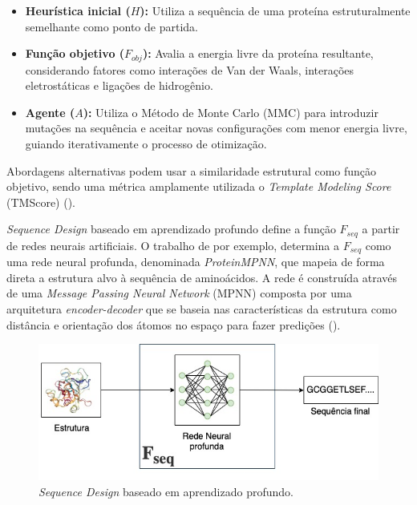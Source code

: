 \begin{itemize}
    \item \textbf{Heurística inicial ($H$):}  
    Utiliza a sequência de uma proteína estruturalmente semelhante como ponto de partida.

    \item \textbf{Função objetivo ($F_{obj}$):}  
    Avalia a energia livre da proteína resultante, considerando fatores como interações de Van der Waals,
    interações eletrostáticas e ligações de hidrogênio.

    \item \textbf{Agente ($A$):}  
    Utiliza o Método de Monte Carlo (MMC) para introduzir mutações na sequência e aceitar novas configurações com menor energia livre,
    guiando iterativamente o processo de otimização.
\end{itemize}

Abordagens alternativas podem usar a similaridade estrutural como função objetivo,
sendo uma métrica amplamente utilizada o \textit{Template Modeling Score} (TMScore) (\cite{tmscore}).

\textit{Sequence Design} baseado em aprendizado profundo define a função $F_{seq}$ 
a partir de redes neurais artificiais. 
O trabalho de \cite{ProteinMPNN} por exemplo, 
determina a $F_{seq}$ como uma rede neural profunda, denominada \textit{ProteinMPNN}, 
que mapeia de forma direta a estrutura alvo à sequência de aminoácidos. 
A rede é construída através de uma \textit{Message Passing Neural Network} (MPNN) 
composta por uma arquitetura \textit{encoder-decoder} 
que se baseia nas características da estrutura como distância e orientação dos átomos no espaço 
para fazer predições (\cite{ProteinMPNN}). 

\begin{figure}[H]
  \centering
  \includegraphics[width=.8\textwidth]{figuras/metodologia-DeepLearningBased.jpg}
  \caption{\textit{Sequence Design} baseado em aprendizado profundo.}
\end{figure}

